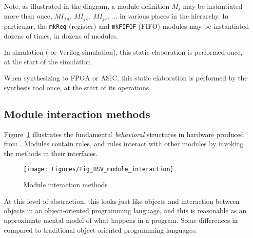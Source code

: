 Note, as illustrated in the diagram, a module definition $M_j$ may be
instantiated more than once, $MI_{j\,a}$, $MI_{j\,b}$, $MI_{j\,c}$,
... in various places in the hierarchy.  In particular, the
\verb|mkReg| (register) and \verb|mkFIFOF| (FIFO) modules may be
instantiated dozens of times, in dozens of modules.

In simulation ({\BLUESIM} or Verilog simulation), this static elaboration
is performed once, at the start of the simulation.

When synthesizing to FPGA or ASIC, this static elaboration is
performed by the synthesis tool once, at the start of its operations.


\subsection{Module interaction {\via} methods}

\label{Sec_module_interaction_via_methods}


Figure~\ref{Fig_BSV_module_interaction} illustrates the fundamental
\emph{behavioral} structures in hardware produced from {\BSV}.  Modules
contain rules, and rules interact with other modules by invoking the
methods in their interfaces.
\begin{figure}[htbp]
  \centerline{\texttt{[image: Figures/Fig\_BSV\_module\_interaction]}}
  \caption{\label{Fig_BSV_module_interaction}
           Module interaction {\via} methods}
\end{figure}

At this level of abstraction, this looks just like objects and
interaction between objects in an object-oriented programming
language, and this is reasonable as an approximate mental model of
what happens in a {\BSV} program.  Some differences in {\BSV} compared to
traditional object-oriented programming languages:

